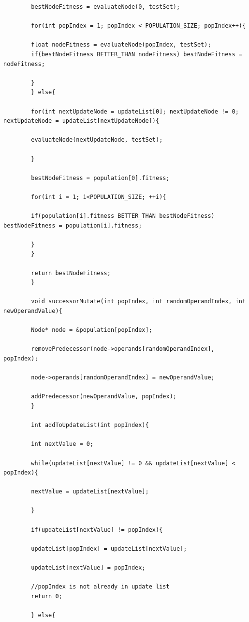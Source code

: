 \documentclass{article}
\begin{document}
\begin{lstlisting}
	    bestNodeFitness = evaluateNode(0, testSet);
	    
	    for(int popIndex = 1; popIndex < POPULATION_SIZE; popIndex++){
	    
	    float nodeFitness = evaluateNode(popIndex, testSet);
	    if(bestNodeFitness BETTER_THAN nodeFitness) bestNodeFitness = nodeFitness;
	    
	    }
	    } else{
	    
	    for(int nextUpdateNode = updateList[0]; nextUpdateNode != 0; nextUpdateNode = updateList[nextUpdateNode]){
	    
	    evaluateNode(nextUpdateNode, testSet);
	    
	    }
	    
	    bestNodeFitness = population[0].fitness;
	    
	    for(int i = 1; i<POPULATION_SIZE; ++i){
	    
	    if(population[i].fitness BETTER_THAN bestNodeFitness) bestNodeFitness = population[i].fitness;
	    
	    }
	    }
	    
	    return bestNodeFitness;
	    }
	    
	    void successorMutate(int popIndex, int randomOperandIndex, int newOperandValue){
	    
	    Node* node = &population[popIndex];
	    
	    removePredecessor(node->operands[randomOperandIndex], popIndex);
	    
	    node->operands[randomOperandIndex] = newOperandValue;
	    
	    addPredecessor(newOperandValue, popIndex);
	    }
	    
	    int addToUpdateList(int popIndex){
	    
	    int nextValue = 0;
	    
	    while(updateList[nextValue] != 0 && updateList[nextValue] < popIndex){
	    
	    nextValue = updateList[nextValue];
	    
	    }
	    
	    if(updateList[nextValue] != popIndex){
	    
	    updateList[popIndex] = updateList[nextValue];
	    
	    updateList[nextValue] = popIndex;
	    
	    //popIndex is not already in update list
	    return 0;
	    
	    } else{
	    

\end{lstlisting}
\end{document}
